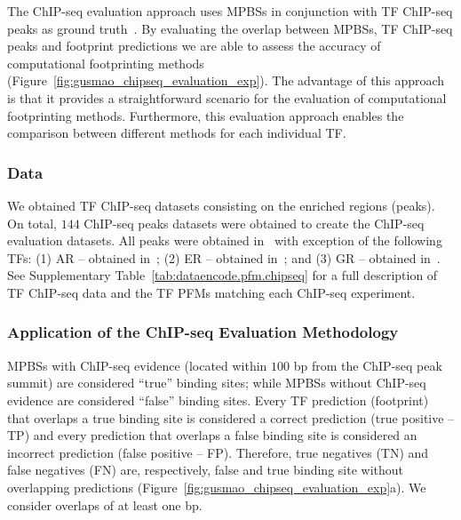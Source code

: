 The ChIP-seq evaluation approach uses MPBSs in conjunction with TF ChIP-seq peaks as ground truth~\citep{pique2011,boyle2011,cuellar2012}. By evaluating the overlap between MPBSs, TF ChIP-seq peaks and footprint predictions we are able to assess the accuracy of computational footprinting methods (Figure~\ref{fig:gusmao_chipseq_evaluation_exp}). The advantage of this approach is that it provides a straightforward scenario for the evaluation of computational footprinting methods. Furthermore, this evaluation approach enables the comparison between different methods for each individual TF.

\subsubsection{Data}

We obtained TF ChIP-seq datasets consisting on the enriched regions (peaks). On total, $144$ ChIP-seq peaks datasets were obtained to create the ChIP-seq evaluation datasets. All peaks were obtained in~\cite{encode2012} with exception of the following TFs: (1) AR -- obtained in~\cite{yu2010}; (2) ER -- obtained in~\cite{guertin2014}; and (3) GR -- obtained in~\cite{john2011}. See Supplementary Table~\ref{tab:dataencode.pfm.chipseq} for a full description of TF ChIP-seq data and the TF PFMs matching each ChIP-seq experiment.

\subsubsection{Application of the ChIP-seq Evaluation Methodology}

MPBSs with ChIP-seq evidence (located within $100$ bp from the ChIP-seq peak summit) are considered ``true'' binding sites; while MPBSs without ChIP-seq evidence are considered ``false'' binding sites. Every TF prediction (footprint) that overlaps a true binding site is considered a correct prediction (true positive -- TP) and every prediction that overlaps a false binding site is considered an incorrect prediction (false positive -- FP). Therefore, true negatives (TN) and false negatives (FN) are, respectively, false and true binding site without overlapping predictions (Figure~\ref{fig:gusmao_chipseq_evaluation_exp}a). We consider overlaps of at least one bp.

